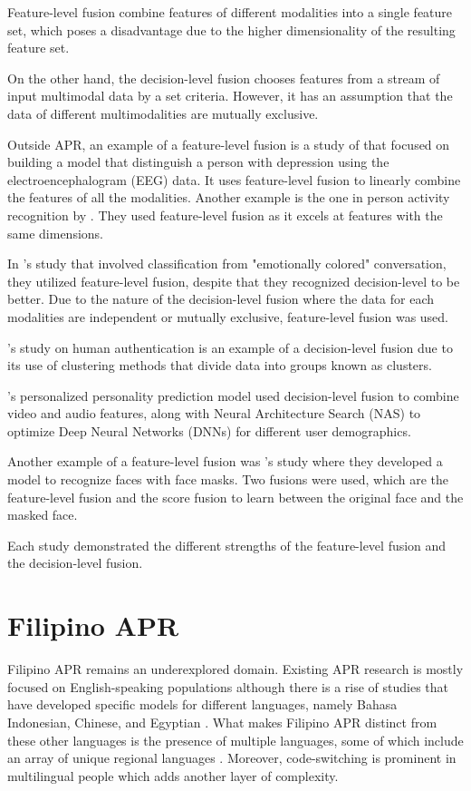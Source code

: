 Feature-level fusion combine features of different modalities into a single feature set, which poses a disadvantage due to the higher dimensionality of the resulting feature set. 

On the other hand, the decision-level fusion chooses features from a stream of input multimodal data by a set criteria. However, it has an assumption that the data of different multimodalities are mutually exclusive.

Outside APR, an example of a feature-level fusion is a study of \citet{Cai_Qu_Li_Zhang_Hu_Hu_2020} that focused on building a model that distinguish a person with depression using the electroencephalogram (EEG) data. It uses feature-level fusion to linearly combine the features of all the modalities. Another example is the one in person activity recognition by \citet{Ehatisham-Ul-Haq_Javed_Azam_Malik_Irtaza_Lee_Mahmood_2019}. They used feature-level fusion as it excels at features with the same dimensions.

In \citet{Sidorov2014}'s study that involved classification from "emotionally colored" conversation, they utilized feature-level fusion, despite that they recognized decision-level to be better. Due to the nature of the decision-level fusion where the data for each modalities are independent or mutually exclusive, feature-level fusion was used.

\citet{}'s study on human authentication is an example of a decision-level fusion due to its use of clustering methods that divide data into groups known as clusters.

\citet{Salam2022}'s personalized personality prediction model used decision-level fusion to combine video and audio features, along with Neural Architecture Search (NAS) to optimize Deep Neural Networks (DNNs) for different user demographics.

Another example of a feature-level fusion was \citet{Abozaid2024}'s study where they developed a model to recognize faces with face masks. Two fusions were used, which are the feature-level fusion and the score fusion to learn between the original face and the masked face.

Each study demonstrated the different strengths of the feature-level fusion and the decision-level fusion.

\section{Filipino APR}
\label{sec: FilipinoAPR}
Filipino APR remains an underexplored domain. Existing APR research is mostly focused on English-speaking populations although there is a rise of studies that have developed specific models for different languages, namely Bahasa Indonesian, Chinese, and Egyptian \citep{Siddique2019, Salem2019, Adi2018}. What makes Filipino APR distinct from these other languages is the presence of multiple languages, some of which include an array of unique regional languages \citep{tighe_modeling_2018}. Moreover, code-switching is prominent in multilingual people which adds another layer of complexity.

